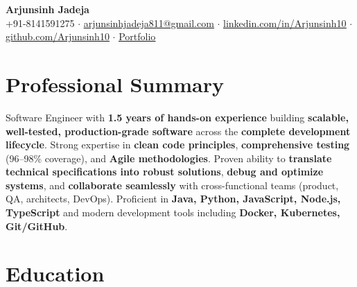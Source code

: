 \documentclass[a4paper,10pt]{article}
\begin{document}
\begin{center}
    {\Huge \bfseries Arjunsinh Jadeja} \\[3pt]
    +91-8141591275
    \hspace{1.5em}$\cdot$\hspace{1.5em}
    \href{mailto:arjunsinhjadeja811@gmail.com}{\uline{arjunsinhjadeja811@gmail.com}}
    \hspace{1.5em}$\cdot$\hspace{1.5em}
    \href{https://linkedin.com/in/Arjunsinh10}{\uline{linkedin.com/in/Arjunsinh10}}
    \hspace{1.5em}$\cdot$\hspace{1.5em}
    \href{https://github.com/Arjunsinh10}{\uline{github.com/Arjunsinh10}}
    \hspace{1.5em}$\cdot$\hspace{1.5em}
    \href{https://arjunsinh10.github.io/}{\uline{Portfolio}}
\end{center}

\vspace{-2.2em}

\section*{Professional Summary}
\vspace{-0.5em}
Software Engineer with \textbf{1.5 years of hands-on experience} building \textbf{scalable, well-tested, production-grade software} across the \textbf{complete development lifecycle}. Strong expertise in \textbf{clean code principles}, \textbf{comprehensive testing} (96--98\% coverage), and \textbf{Agile methodologies}. Proven ability to \textbf{translate technical specifications into robust solutions}, \textbf{debug and optimize systems}, and \textbf{collaborate seamlessly} with cross-functional teams (product, QA, architects, DevOps). Proficient in \textbf{Java, Python, JavaScript, Node.js, TypeScript} and modern development tools including \textbf{Docker, Kubernetes, Git/GitHub}.

\vspace{-0.6em}

\section*{Education}
\vspace{-0.5em}
\end{document}
